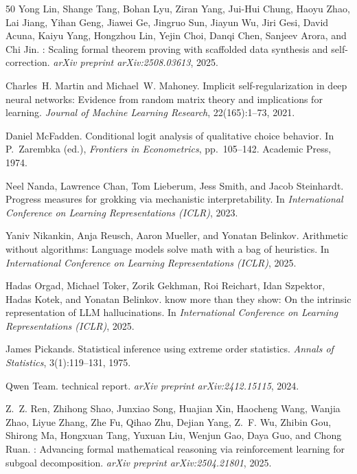\begin{thebibliography}{50}
Yong Lin, Shange Tang, Bohan Lyu, Ziran Yang, Jui-Hui Chung, Haoyu Zhao, Lai Jiang, Yihan Geng, Jiawei Ge, Jingruo Sun, Jiayun Wu, Jiri Gesi, David Acuna, Kaiyu Yang, Hongzhou Lin, Yejin Choi, Danqi Chen, Sanjeev Arora, and Chi Jin.
: Scaling formal theorem proving with scaffolded data synthesis and self-correction.
\newblock \emph{arXiv preprint arXiv:2508.03613}, 2025.

Charles~H. Martin and Michael~W. Mahoney.
\newblock Implicit self-regularization in deep neural networks: Evidence from random matrix theory and implications for learning.
\newblock \emph{Journal of Machine Learning Research}, 22(165):1--73, 2021.

Daniel McFadden.
\newblock Conditional logit analysis of qualitative choice behavior.
\newblock In P.~Zarembka (ed.), \emph{Frontiers in Econometrics}, pp.\ 105--142. Academic Press, 1974.

Neel Nanda, Lawrence Chan, Tom Lieberum, Jess Smith, and Jacob Steinhardt.
\newblock Progress measures for grokking via mechanistic interpretability.
\newblock In \emph{International Conference on Learning Representations (ICLR)}, 2023.

Yaniv Nikankin, Anja Reusch, Aaron Mueller, and Yonatan Belinkov.
\newblock Arithmetic without algorithms: Language models solve math with a bag of heuristics.
\newblock In \emph{International Conference on Learning Representations (ICLR)}, 2025.

Hadas Orgad, Michael Toker, Zorik Gekhman, Roi Reichart, Idan Szpektor, Hadas Kotek, and Yonatan Belinkov.
 know more than they show: On the intrinsic representation of {LLM} hallucinations.
\newblock In \emph{International Conference on Learning Representations (ICLR)}, 2025.

James Pickands.
\newblock Statistical inference using extreme order statistics.
\newblock \emph{Annals of Statistics}, 3(1):119--131, 1975.

Qwen Team.
 technical report.
\newblock \emph{arXiv preprint arXiv:2412.15115}, 2024.

Z.~Z. Ren, Zhihong Shao, Junxiao Song, Huajian Xin, Haocheng Wang, Wanjia Zhao, Liyue Zhang, Zhe Fu, Qihao Zhu, Dejian Yang, Z.~F. Wu, Zhibin Gou, Shirong Ma, Hongxuan Tang, Yuxuan Liu, Wenjun Gao, Daya Guo, and Chong Ruan.
: Advancing formal mathematical reasoning via reinforcement learning for subgoal decomposition.
\newblock \emph{arXiv preprint arXiv:2504.21801}, 2025.


\end{thebibliography}
